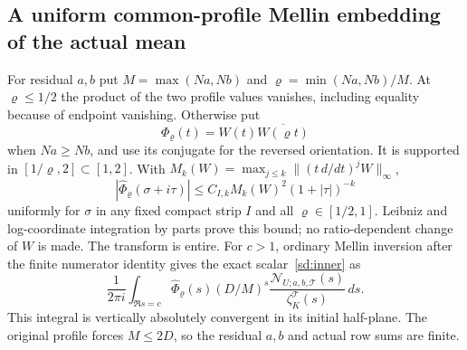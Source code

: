 \documentclass[11pt]{article}
\theoremstyle{definition}\newtheorem{definition}[theorem]{Definition}
\theoremstyle{remark}\newtheorem{remark}[theorem]{Remark}
\begin{document}
\subsection{A uniform common-profile Mellin embedding of the actual mean}
For residual $a,b$ put $M=\max(Na,Nb)$ and
$\varrho=\min(Na,Nb)/M$. At $\varrho\le1/2$ the product of the two
profile values vanishes, including equality because of endpoint
vanishing. Otherwise put
\[
 \Phi_\varrho(t)=W(t)\overline{W(\varrho t)}
\]
when $Na\ge Nb$, and use its conjugate for the reversed orientation.
It is supported in $[1/\varrho,2]\subset[1,2]$.
With $M_k(W)=\max_{j\le k}\|(t\,d/dt)^jW\|_\infty$,
\begin{equation}\label{sd:profile-mellin}
 |\widehat\Phi_\varrho(\sigma+i\tau)|
 \le C_{I,k}M_k(W)^2(1+|\tau|)^{-k}
\end{equation}
uniformly for $\sigma$ in any fixed compact strip $I$ and all
$\varrho\in[1/2,1]$. Leibniz and log-coordinate integration by parts
prove this bound; no ratio-dependent change of $W$ is made.
The transform is entire. For $c>1$, ordinary Mellin inversion after the
finite numerator identity gives the exact scalar~\eqref{sd:inner} as
\begin{equation}\label{sd:mellin}
 \frac1{2\pi i}\int_{\Re s=c}
 \widehat\Phi_\varrho(s)(D/M)^s
 \frac{\mathcal N_{U;a,b,\mathcal T}(s)}
                      {\zeta_K^{\mathcal T}(s)}\,ds.
\end{equation}
This integral is vertically absolutely convergent in its initial
half-plane. The original profile forces $M\le2D$, so the residual $a,b$
and actual row sums are finite.
\end{document}
